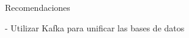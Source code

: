 \begin{recomendations}
    Recomendaciones
    
    - Utilizar Kafka para unificar las bases de datos
\end{recomendations}
